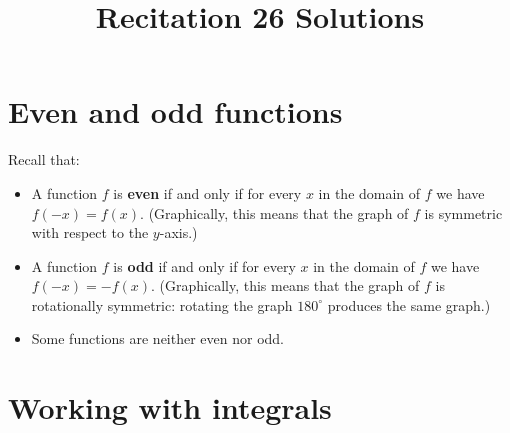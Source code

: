 \documentclass[nooutcomes]{ximera}
\title{Recitation 26 Solutions}
\begin{document}
\begin{abstract}		\end{abstract}
\maketitle

\section{Even and odd functions}
Recall that:
\begin{itemize}
  \item 
    A function $f$ is \textbf{even} if and only if for every $x$ in the domain of $f$ we have $f(-x) = f(x)$.
    (Graphically, this means that the graph of $f$ is symmetric with respect to the $y$-axis.)

  \item 
    A function $f$ is \textbf{odd} if and only if for every $x$ in the domain of $f$ we have $f(-x) = -f(x)$.
   (Graphically, this means that the graph of $f$ is rotationally symmetric: rotating the graph $180^\circ$ produces the same graph.)

 \item 
   Some functions are neither even nor odd.
\end{itemize}

\section{Working with integrals}
\end{document}
